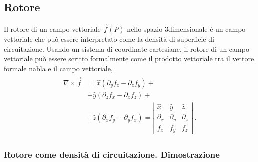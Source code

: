\documentclass[letterpaper,10pt,english]{jupyterBook}
\begin{document}
\subsection{Rotore}
\label{\detokenize{ch/vector-calculus/derivatives:rotore}}
\sphinxAtStartPar
Il rotore di un campo vettoriale \(\vec{f}(P)\) nello spazio 3\sphinxhyphen{}dimensionale è un campo vettoriale che può essere interpretato come la densità di superficie di circuitazione. Usando un sistema di coordinate cartesiane, il rotore di un campo vettoriale può essere scritto formalmente come il prodotto vettoriale tra il vettore formale nabla e il campo vettoriale,
\begin{equation*}
\begin{split}\begin{aligned}
  \nabla \times \vec{f} & = \hat{x} \left( \partial_y f_z - \partial_z f_y \right) + \\ 
                        & + \hat{y} \left( \partial_z f_x - \partial_x f_z \right) + \\
                        & + \hat{z} \left( \partial_x f_y - \partial_y f_x \right) 
    = \left| \begin{matrix} \hat{x} & \hat{y} & \hat{z} \\ \partial_x & \partial_y & \partial_z \\ f_x & f_y & f_z \end{matrix} \right| \ .
\end{aligned}\end{split}
\end{equation*}\subsubsection*{Rotore come densità di circuitazione. Dimostrazione}
\end{document}
